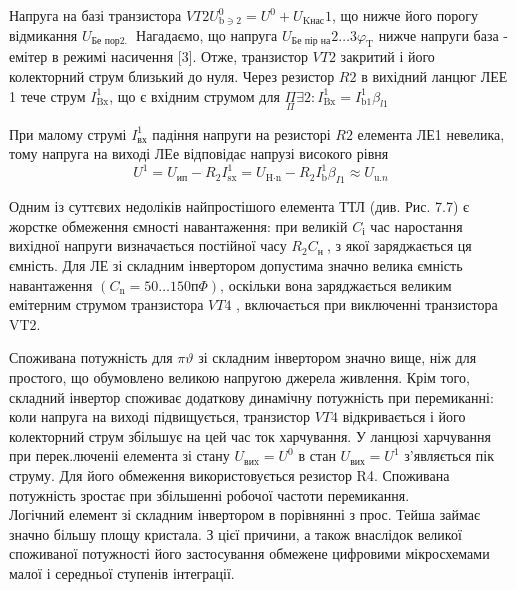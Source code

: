 \documentclass[a4paper,14pt]{extreport}
\begin{document}
  Напруга на базі транзистора $ VT 2 U _ {\text{b} \ni 2} ^ {0} = U ^ {0} + U _ {\text{K} \text {нас}} 1 $, що нижче його порогу відмикання $ U _ {\text {Бе пор2. }} $ Нагадаємо, що напруга $ U _ {\text {Бе пір на}} 2 \ldots 3 \varphi _ {\text{T}} $ нижче напруги база - емітер в режимі насичення [3]. Отже, транзистор $ V T 2 $ закритий і його колекторний струм близький до нуля. Через резистор $ R 2 $ в вихідний ланцюг ЛЕЕ 1 тече струм $ I _ {\text{Bx}} ^ {1} $, що є вхідним струмом для $ \underset {\Pi} {\Pi} \exists 2: I _ {\text{Bx}} ^ {1} = I _ {\text{b} 1} ^ {1} \beta_{l 1} $

  При малому струмі $ I_{\text{вх}}^{1} $ падіння напруги на резисторі 
  $ R 2 $ елемента ЛЕ1 невелика, тому напруга на виході ЛЕе відповідає напрузі високого рівня
  $$
  U ^ {1} = U_ {\text{ип}} -R_ {2} I _ {\text{sx}} ^ {1} = U _ {\text{H} \cdot \text{n}} - R_ { 2} I _ {\text{b}} ^ {1} \beta_ {I 1} \approx U _ {\text{u}. n}
  $$

  Одним із суттєвих недоліків найпростішого елемента ТТЛ (див. Рис. 7.7) є жорстке обмеження ємності навантаження: при великій $ C_ {\text {і}} $
   час наростання вихідної напруги визначається постійної часу $ R_ {2}
    C _ {\text {н }} $, з якої заряджається ця ємність. Для ЛЕ зі складним
     інвертором допустима значно велика ємність навантаження 
     $ \left (C _ {\text{n}} = 50 \ldots 150 \text{п} \Phi \right) $,
      оскільки вона заряджається великим емітерним струмом транзистора
       $ VT 4 $ , включається при виключенні транзистора $ \text{VT} 2 $.

  Споживана потужність для $ \pi \vartheta $ зі складним інвертором значно вище, ніж для простого, що обумовлено великою напругою джерела живлення. Крім того, складний інвертор споживає додаткову динамічну потужність при перемиканні: коли напруга на виході підвищується, транзистор $ V T 4 $ відкривається і його колекторний струм збільшує на цей час ток харчування. У ланцюзі харчування при перек.люченіі елемента зі стану $ U _ {\text {виx}} = U ^ {0} $ в стан $ U _ {\text {вих}} = U ^ {1} $ з'являється пік струму. Для його обмеження використовується резистор R4. Споживана потужність зростає при збільшенні робочої частоти перемикання.\\

  Логічний елемент зі складним інвертором в порівнянні з прос. Тейша займає значно більшу площу кристала. З цієї причини, а також внаслідок великої споживаної потужності його застосування обмежене цифровими мікросхемами малої і середньої ступенів інтеграції.
\end{document}
